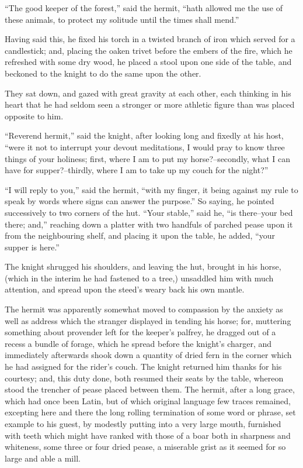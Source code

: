 ``The good keeper of the forest,'' said the hermit, ``hath allowed me
the use of these animals, to protect my solitude until the times shall
mend.''

Having said this, he fixed his torch in a twisted branch of iron which
served for a candlestick; and, placing the oaken trivet before the
embers of the fire, which he refreshed with some dry wood, he placed a
stool upon one side of the table, and beckoned to the knight to do the
same upon the other.

They sat down, and gazed with great gravity at each other, each thinking
in his heart that he had seldom seen a stronger or more athletic figure
than was placed opposite to him.

``Reverend hermit,'' said the knight, after looking long and fixedly at
his host, ``were it not to interrupt your devout meditations, I would
pray to know three things of your holiness; first, where I am to put my
horse?--secondly, what I can have for supper?--thirdly, where I am to
take up my couch for the night?''

``I will reply to you,'' said the hermit, ``with my finger, it being
against my rule to speak by words where signs can answer the purpose.''
So saying, he pointed successively to two corners of the hut. ``Your
stable,'' said he, ``is there--your bed there; and,'' reaching down a
platter with two handfuls of parched pease upon it from the neighbouring
shelf, and placing it upon the table, he added, ``your supper is here.''

The knight shrugged his shoulders, and leaving the hut, brought in his
horse, (which in the interim he had fastened to a tree,) unsaddled him
with much attention, and spread upon the steed's weary back his own
mantle.

The hermit was apparently somewhat moved to compassion by the anxiety as
well as address which the stranger displayed in tending his horse; for,
muttering something about provender left for the keeper's palfrey, he
dragged out of a recess a bundle of forage, which he spread before the
knight's charger, and immediately afterwards shook down a quantity of
dried fern in the corner which he had assigned for the rider's couch.
The knight returned him thanks for his courtesy; and, this duty done,
both resumed their seats by the table, whereon stood the trencher of
pease placed between them. The hermit, after a long grace, which had
once been Latin, but of which original language few traces remained,
excepting here and there the long rolling termination of some word or
phrase, set example to his guest, by modestly putting into a very large
mouth, furnished with teeth which might have ranked with those of a boar
both in sharpness and whiteness, some three or four dried pease, a
miserable grist as it seemed for so large and able a mill.

